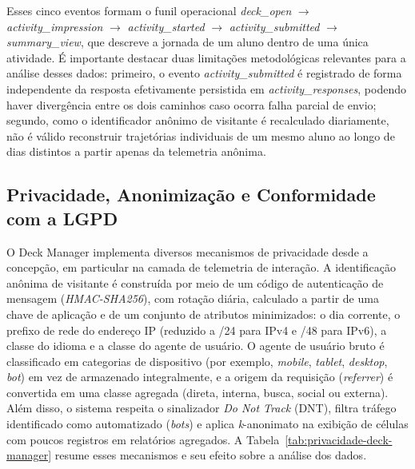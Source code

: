 Esses cinco eventos formam o funil operacional \textit{deck\_open}
$\rightarrow$ \textit{activity\_impression} $\rightarrow$
\textit{activity\_started} $\rightarrow$ \textit{activity\_submitted}
$\rightarrow$ \textit{summary\_view}, que descreve a jornada de um aluno
dentro de uma única atividade. É importante destacar duas limitações
metodológicas relevantes para a análise desses dados: primeiro, o evento
\textit{activity\_submitted} é registrado de forma independente da
resposta efetivamente persistida em \textit{activity\_responses}, podendo
haver divergência entre os dois caminhos caso ocorra falha parcial de
envio; segundo, como o identificador anônimo de visitante é recalculado
diariamente, não é válido reconstruir trajetórias individuais de um mesmo
aluno ao longo de dias distintos a partir apenas da telemetria anônima.

\subsection{Privacidade, Anonimização e Conformidade com a LGPD}
\label{subsec:privacidade}

O Deck Manager implementa diversos mecanismos de privacidade desde a
concepção, em particular na camada de telemetria de interação. A
identificação anônima de visitante é construída por meio de um código de
autenticação de mensagem (\textit{HMAC-SHA256}), com rotação diária,
calculado a partir de uma chave de aplicação e de um conjunto de atributos
minimizados: o dia corrente, o prefixo de rede do endereço IP (reduzido a
/24 para IPv4 e /48 para IPv6), a classe do idioma e a classe do agente de
usuário. O agente de usuário bruto é classificado em categorias de
dispositivo (por exemplo, \textit{mobile}, \textit{tablet},
\textit{desktop}, \textit{bot}) em vez de armazenado integralmente, e a
origem da requisição (\textit{referrer}) é convertida em uma classe
agregada (direta, interna, busca, social ou externa). Além disso, o
sistema respeita o sinalizador \textit{Do Not Track} (DNT), filtra tráfego
identificado como automatizado (\textit{bots}) e aplica \textit{k}-anonimato
na exibição de células com poucos registros em relatórios agregados. A
Tabela~\ref{tab:privacidade-deck-manager} resume esses mecanismos e seu
efeito sobre a análise dos dados.

